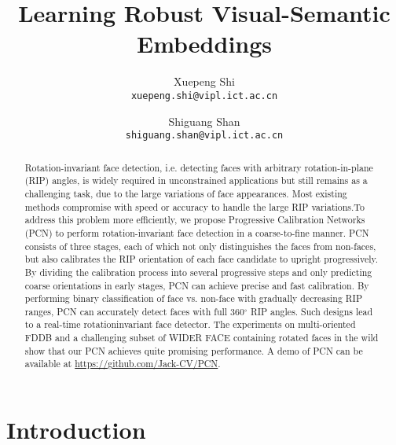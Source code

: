 \documentclass[10pt,twocolumn,letterpaper]{article}
\begin{document}
\title{Learning Robust Visual-Semantic Embeddings\\}

\author{Xuepeng Shi\\
{\tt\small xuepeng.shi@vipl.ict.ac.cn}
\and
Shiguang Shan\\
{\tt\small shiguang.shan@vipl.ict.ac.cn}
}

\maketitle

\begin{abstract}
   Rotation-invariant face detection, i.e. detecting faces
   with arbitrary rotation-in-plane (RIP) angles, is widely required
   in unconstrained applications but still remains as a
   challenging task, due to the large variations of face appearances.
   Most existing methods compromise with speed or
   accuracy to handle the large RIP variations.To address
   this problem more efficiently, we propose Progressive Calibration
   Networks (PCN) to perform rotation-invariant face
   detection in a coarse-to-fine manner. PCN consists of three
   stages, each of which not only distinguishes the faces from
   non-faces, but also calibrates the RIP orientation of each
   face candidate to upright progressively. By dividing the
   calibration process into several progressive steps and only
   predicting coarse orientations in early stages, PCN can
   achieve precise and fast calibration. By performing binary
   classification of face vs. non-face with gradually decreasing
   RIP ranges, PCN can accurately detect faces with full
   360$^\circ$ RIP angles. Such designs lead to a real-time rotationinvariant
   face detector. The experiments on multi-oriented
   FDDB and a challenging subset of WIDER FACE containing
   rotated faces in the wild show that our PCN achieves
   quite promising performance. A demo of PCN can be available
   at \url{https://github.com/Jack-CV/PCN}.
\end{abstract}

\section{Introduction}
\end{document}
